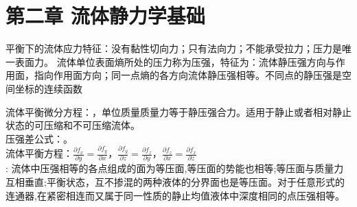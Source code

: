 \section{第二章 \quad 流体静力学基础}


平衡下的流体应力特征：没有黏性切向力；只有法向力；不能承受拉力；压力是唯一表面力。
流体单位表面熵所处的压力称为压强，特征为：流体静压强方向与作用面，指向作用面方向；同一点熵的各方向流体静压强相等。不同点的静压强是空间坐标的连续函数

\divider


流体平衡微分方程：，单位质量质量力等于静压强合力。适用于静止或者相对静止状态的可压缩和不可压缩流体。\\
压强差公式：。\\
流体平衡方程：$\frac{\partial f_x}{\partial y}=\frac{\partial f_y}{\partial x}$，$\frac{\partial f_y}{\partial z}=\frac{\partial f_z}{\partial y}$，$\frac{\partial f_z}{\partial x}=\frac{\partial f_x}{\partial z}$\\
: 流体中压强相等的各点组成的面为等压面,等压面的势能也相等;等压面与质量力互相垂直;平衡状态，互不掺混的两种液体的分界面也是等压面。对于任意形式的连通器,在紧密相连而又属于同一性质的静止均值液体中深度相同的点压强相等。

\divider


